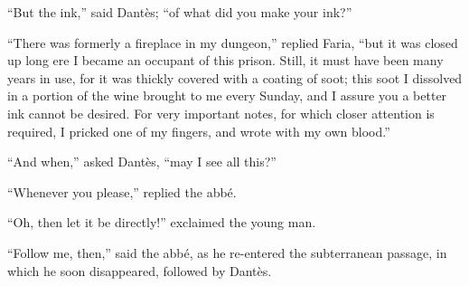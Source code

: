 “But the ink,” said Dantès; “of what did you make your ink?”

“There was formerly a fireplace in my dungeon,” replied Faria, “but it
was closed up long ere I became an occupant of this prison. Still, it
must have been many years in use, for it was thickly covered with a
coating of soot; this soot I dissolved in a portion of the wine brought
to me every Sunday, and I assure you a better ink cannot be desired.
For very important notes, for which closer attention is required, I
pricked one of my fingers, and wrote with my own blood.”

“And when,” asked Dantès, “may I see all this?”

“Whenever you please,” replied the abbé.

“Oh, then let it be directly!” exclaimed the young man.

“Follow me, then,” said the abbé, as he re-entered the subterranean
passage, in which he soon disappeared, followed by Dantès.
